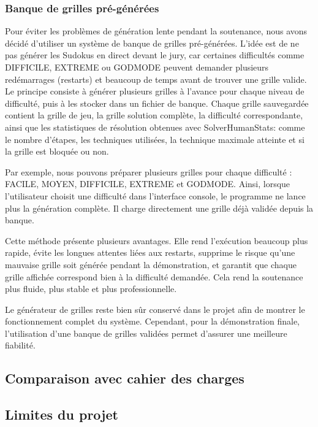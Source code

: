 \documentclass[a4paper]{article}
\begin{document}
\subsubsection{Banque de grilles pré-générées}

Pour éviter les problèmes de génération lente pendant la soutenance, nous avons décidé d’utiliser un système de banque de grilles pré-générées. L’idée est de ne pas générer les Sudokus en direct devant le jury, car certaines difficultés comme DIFFICILE, EXTREME ou GODMODE peuvent demander plusieurs redémarrages (restarts) et beaucoup de temps avant de trouver une grille valide.
Le principe consiste à générer plusieurs grilles à l’avance pour chaque niveau de difficulté, puis à les stocker dans un fichier de banque. Chaque grille sauvegardée contient la grille de jeu, la grille solution complète, la difficulté correspondante, ainsi que les statistiques de résolution obtenues avec SolverHumanStats: comme le nombre d’étapes, les techniques utilisées, la technique maximale atteinte et si la grille est bloquée ou non.

Par exemple, nous pouvons préparer plusieurs grilles pour chaque difficulté : FACILE, MOYEN, DIFFICILE, EXTREME et GODMODE. Ainsi, lorsque l’utilisateur choisit une difficulté dans l’interface console, le programme ne lance plus la génération complète. Il charge directement une grille déjà validée depuis la banque.

Cette méthode présente plusieurs avantages. Elle rend l’exécution beaucoup plus rapide, évite les longues attentes liées aux restarts, supprime le risque qu’une mauvaise grille soit générée pendant la démonstration, et garantit que chaque grille affichée correspond bien à la difficulté demandée. Cela rend la soutenance plus fluide, plus stable et plus professionnelle.

Le générateur de grilles reste bien sûr conservé dans le projet afin de montrer le fonctionnement complet du système. Cependant, pour la démonstration finale, l’utilisation d’une banque de grilles validées permet d’assurer une meilleure fiabilité.

\subsection{Comparaison avec cahier des charges}

\subsection{Limites du projet}
\end{document}
